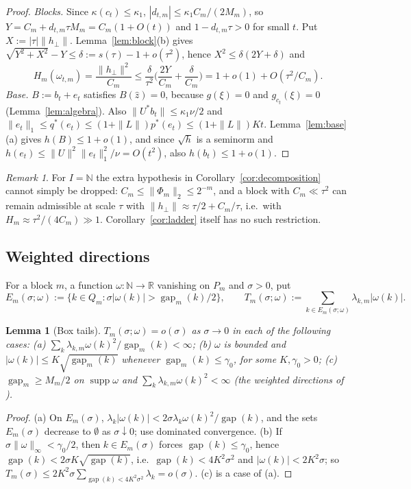 \documentclass[10pt]{amsart}
\newtheorem{lemma}[theorem]{Lemma}
\theoremstyle{definition}
\theoremstyle{remark}
\newtheorem{remark}[theorem]{Remark}
\newcommand{\supp}{\operatorname{supp}}
\newcommand{\R}{\mathbb R}
\newcommand{\N}{\mathbb N}
\newcommand{\gap}{\operatorname{gap}}
\newcommand{\zh}{\hat z}
\begin{document}
\begin{proof}
\emph{Blocks.}  Since $\kappa(c_t)\le\kappa_1$, $|d_{t,m}|\le
\kappa_1C_m/(2M_m)$, so $Y=C_m+d_{t,m}\tau M_m=C_m(1+O(t))$ and
$1-d_{t,m}\tau>0$ for small $t$.  Put $X:=|\tau|\|h_\perp\|$.
Lemma~\ref{lem:block}(b) gives $\sqrt{Y^2+X^2}-Y\le\delta:=s(\tau)-1+o(\tau^2)$,
hence $X^2\le\delta(2Y+\delta)$ and
\[
 H_m(\omega_{t,m})=\frac{\|h_\perp\|^2}{C_m}\le\frac\delta{\tau^2}
 \Big(\frac{2Y}{C_m}+\frac\delta{C_m}\Big)=1+o(1)+O(\tau^2/C_m).
\]
\emph{Base.}  $B:=b_t+e_t$ satisfies $B(\zh)=0$, because $g(\xi)=0$ and
$g_{c_t}(\xi)=0$ (Lemma~\ref{lem:algebra}).  Also $\|U^*b_t\|\le
\kappa_1\nu/2$ and $\|e_t\|_1\le q^*(e_t)\le(1+\|L\|)p^*(e_t)\le(1+\|L\|)Kt$.
Lemma~\ref{lem:base}(a) gives $h(B)\le1+o(1)$, and since $\sqrt h$ is a
seminorm and $h(e_t)\le\|U\|^2\|e_t\|_1^2/\nu=O(t^2)$, also $h(b_t)\le
1+o(1)$.
\end{proof}

\begin{remark}\label{rem:G2}
For $I=\N$ the extra hypothesis in Corollary~\ref{cor:decomposition} cannot
simply be dropped: $C_m\le\|\Phi_m\|_2\le2^{-m}$, and a block with
$C_m\ll\tau^2$ can remain admissible at scale $\tau$ with
$\|h_\perp\|\approx\tau/2+C_m/\tau$, i.e.\ with $H_m\approx\tau^2/(4C_m)\gg1$.
Corollary~\ref{cor:ladder} itself has no such restriction.
\end{remark}

\subsection{Weighted directions}
For a block $m$, a function $\omega:\N\to\R$ vanishing on $P_m$ and
$\sigma>0$, put
\[
 E_m(\sigma;\omega):=\{k\in Q_m:\sigma|\omega(k)|>\gap_m(k)/2\},\qquad
 T_m(\sigma;\omega):=\sum_{k\in E_m(\sigma;\omega)}\lambda_{k,m}|\omega(k)|.
\]

\begin{lemma}[Box tails]\label{lem:boxtails}
$T_m(\sigma;\omega)=o(\sigma)$ as $\sigma\to0$ in each of the following cases:
\textup{(a)} $\sum_k\lambda_{k,m}\omega(k)^2/\gap_m(k)<\infty$;
\textup{(b)} $\omega$ is bounded and $|\omega(k)|\le K\sqrt{\gap_m(k)}$
whenever $\gap_m(k)\le\gamma_0$, for some $K,\gamma_0>0$;
\textup{(c)} $\gap_m\ge M_m/2$ on $\supp\omega$ and
$\sum_k\lambda_{k,m}\omega(k)^2<\infty$ \textup{(}the weighted directions
of \cite[Theorem~3.1]{PrA}\textup{)}.
\end{lemma}

\begin{proof}
(a) On $E_m(\sigma)$, $\lambda_k|\omega(k)|<2\sigma\lambda_k\omega(k)^2/
\gap(k)$, and the sets $E_m(\sigma)$ decrease to $\emptyset$ as
$\sigma\downarrow0$; use dominated convergence.  (b) If
$\sigma\|\omega\|_\infty<\gamma_0/2$, then $k\in E_m(\sigma)$ forces
$\gap(k)\le\gamma_0$, hence $\gap(k)<2\sigma K\sqrt{\gap(k)}$, i.e.\
$\gap(k)<4K^2\sigma^2$ and $|\omega(k)|<2K^2\sigma$; so $T_m(\sigma)\le
2K^2\sigma\sum_{\gap(k)<4K^2\sigma^2}\lambda_k=o(\sigma)$.  (c) is a case
of (a).
\end{proof}
\end{document}
